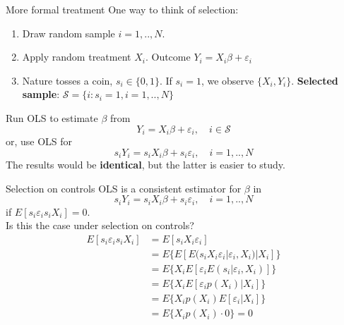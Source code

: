 \documentclass[pdftex]{beamer}
\begin{document}
\begin{frame}{More formal treatment}
	One way to think of selection:
	\begin{enumerate}
		\item{Draw random sample $i=1,..,N$.}
		\item{Apply random treatment $X_i$. Outcome $Y_i = X_i\beta + \varepsilon_i$}
		\item{Nature tosses a coin, $s_i\in\{0,1\}$. If $s_i = 1$, we observe $\{X_i, Y_i\}$. \textbf{Selected sample}: $\mathcal{S} = \{i : s_i=1, i=1,..,N\}$}
	\end{enumerate}
	Run OLS to estimate $\beta$ from
	\begin{equation*}
		Y_i = X_i\beta + \varepsilon_i, \quad i\in\mathcal{S}
	\end{equation*}
	or, use OLS for
	\begin{equation*}
		s_iY_i = s_iX_i\beta + s_i\varepsilon_i, \quad i=1,..,N
	\end{equation*}
	The results would be \textbf{identical}, but the latter is easier to study.
\end{frame}

\begin{frame}{Selection on controls}
OLS is a consistent estimator for $\beta$ in
\begin{equation*}
s_iY_i = s_iX_i\beta + s_i\varepsilon_i, \quad i=1,..,N
\end{equation*}
if $E[s_i\varepsilon_is_iX_i]=0$.\\\medskip
Is this the case under selection on controls?
\begin{align*}
	E[s_i\varepsilon_is_iX_i] &= E[s_iX_i\varepsilon_i]\\
	&= E\{E[E(s_iX_i\varepsilon_i|\varepsilon_i, X_i)|X_i]\}\\
	&= E\{X_iE[\varepsilon_iE(s_i|\varepsilon_i, X_i)]\}\\
	&= E\{X_iE[\varepsilon_ip(X_i)|X_i]\}\\
	&= E\{X_ip(X_i)E[\varepsilon_i|X_i]\}\\
	&= E\{X_ip(X_i)\cdot{0}\} = 0
\end{align*}
\end{frame}
\end{document}
